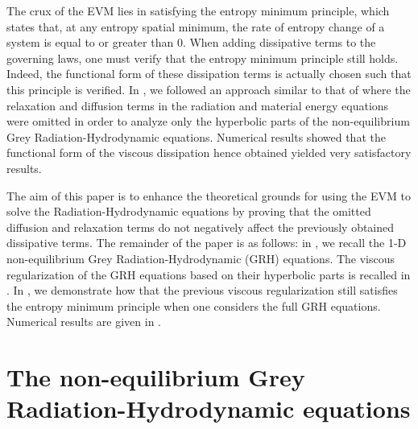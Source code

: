 \documentclass{mc2015}
\begin{document}
The crux of the EVM lies in satisfying the entropy minimum principle, which states that, at any entropy spatial minimum, the rate of entropy change of a system is equal to or greater than 0. When
adding dissipative terms to the governing laws, one must verify that the entropy minimum principle still holds. Indeed, the functional form of these dissipation terms
is actually chosen such that this principle is verified. In \cite{our_jcp_radhy_paper}, we followed an approach similar to that of \cite{Balsara, LowrieMorel} 
where the relaxation and diffusion terms in the radiation and material energy equations were omitted in order to analyze only the hyperbolic parts of 
the non-equilibrium Grey Radiation-Hydrodynamic equations. Numerical results showed that the functional form of the viscous dissipation hence obtained 
yielded very satisfactory results. 

The aim of this paper is to enhance the theoretical grounds for using the EVM to solve the  Radiation-Hydrodynamic equations by proving that the omitted diffusion
and relaxation terms do not negatively affect the previously obtained dissipative terms. The remainder of the paper is as follows: in , we recall
the 1-D non-equilibrium Grey Radiation-Hydrodynamic (GRH) equations. The viscous regularization of the GRH equations based on their hyperbolic parts is recalled in .
In , we demonstrate how that the previous viscous regularization still satisfies the entropy minimum principle when one considers the full GRH equations.
Numerical results are given in .

\section{The non-equilibrium Grey Radiation-Hydrodynamic equations}\label{sec:GRH}
\end{document}
